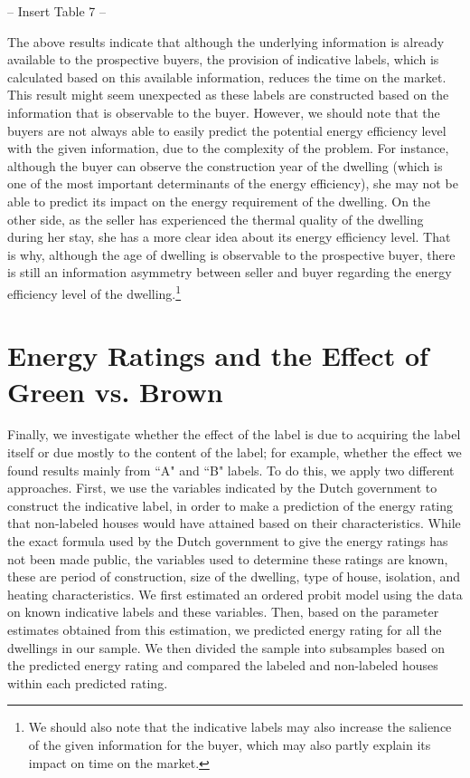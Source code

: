 \documentclass[12pt]{article}
\begin{document}
\begin{center}
-- Insert Table 7 --
\end{center}

The above results indicate that although the underlying information is already available to the prospective buyers, the provision of indicative labels, which is calculated based on this available information, reduces the time on the market. This result might seem unexpected as these labels are constructed based on the information that is observable to the buyer. However, we should note that the buyers are not always able to easily predict the potential energy efficiency level with the given information, due to the complexity of the problem. For instance, although the buyer can observe the construction year of the dwelling (which is one of the most important determinants of the energy efficiency), she may not be able to predict its impact on the energy requirement of the dwelling. On the other side, as the seller has experienced the thermal quality of the dwelling during her stay, she has a more clear idea about its energy efficiency level. That is why, although the age of dwelling is observable to the prospective buyer, there is still an information asymmetry between seller and buyer regarding the energy efficiency level of the dwelling.\footnote{We should also note that the indicative labels may also increase the salience of the given information for the buyer, which may also partly explain its impact on time on the market.}

\section{Energy Ratings and the Effect of Green vs. Brown}

Finally, we investigate whether the effect of the label is due to acquiring the label itself or due mostly to the content of the label; for example, whether the effect we found results mainly from ``A" and ``B" labels. To do this, we apply two different approaches. First, we use the variables indicated by the Dutch government to construct the indicative label, in order to make a prediction of the energy rating that non-labeled houses would have attained based on their characteristics. While the exact formula used by the Dutch government to give the energy ratings has not been made public, the variables used to determine these ratings are known, these are period of construction, size of the dwelling, type of house, isolation, and heating characteristics. We first estimated an ordered probit model using the data on known indicative labels and these variables. Then, based on the parameter estimates obtained from this estimation, we predicted energy rating for all the dwellings in our sample. We then divided the sample into subsamples based on the predicted energy rating and compared the labeled and non-labeled houses within each predicted rating.
\end{document}
